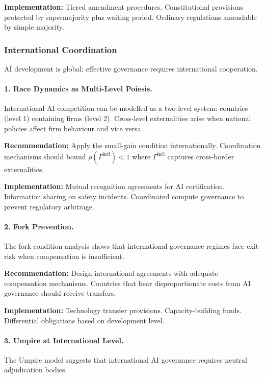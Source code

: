 \documentclass[12pt]{article}
\begin{document}
\textbf{Implementation:} Tiered amendment procedures. Constitutional provisions protected by supermajority plus waiting period. Ordinary regulations amendable by simple majority.

\subsubsection{International Coordination}

AI development is global; effective governance requires international cooperation.

\paragraph{1. Race Dynamics as Multi-Level Poiesis.}
International AI competition can be modelled as a two-level system: countries (level 1) containing firms (level 2). Cross-level externalities arise when national policies affect firm behaviour and vice versa.

\textbf{Recommendation:} Apply the small-gain condition internationally. Coordination mechanisms should bound $\rho(\Gamma^{\text{intl}}) < 1$ where $\Gamma^{\text{intl}}$ captures cross-border externalities.

\textbf{Implementation:} Mutual recognition agreements for AI certification. Information sharing on safety incidents. Coordinated compute governance to prevent regulatory arbitrage.

\paragraph{2. Fork Prevention.}
The fork condition analysis shows that international governance regimes face exit risk when compensation is insufficient.

\textbf{Recommendation:} Design international agreements with adequate compensation mechanisms. Countries that bear disproportionate costs from AI governance should receive transfers.

\textbf{Implementation:} Technology transfer provisions. Capacity-building funds. Differential obligations based on development level.

\paragraph{3. Umpire at International Level.}
The Umpire model suggests that international AI governance requires neutral adjudication bodies.
\end{document}
